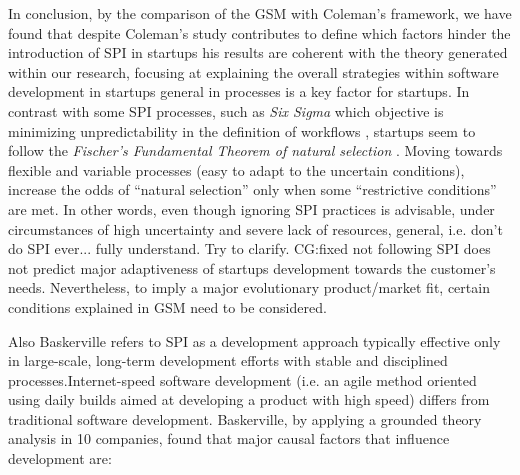 \documentclass[10pt,journal,letterpaper,compsoc]{IEEEtran}
\begin{document}
In conclusion, by the comparison of the GSM with Coleman's framework, we have
found that despite Coleman's study contributes to define which factors hinder
the introduction of SPI in startups %
his results are coherent with the theory generated within our research, focusing
at explaining the overall strategies within software development in
startups%
general in  %
processes is a key factor for startups.  In contrast with some SPI processes,
such as \textit{Six Sigma} which objective  is minimizing unpredictability in
the definition of workflows \cite{Sixsigma},  startups seem to follow the
\textit{Fischer's Fundamental Theorem of natural  selection} \cite{Fisher}.
Moving towards flexible and variable processes (easy  to adapt to the uncertain
conditions), increase the odds of ``natural  selection'' only when some
``restrictive conditions'' are met. In other words,  even though ignoring SPI
practices is advisable, under circumstances of high uncertainty and severe lack
of resources, %
general, i.e. don't do SPI ever... %
fully understand. Try to clarify. CG:fixed  not following SPI does not predict
major adaptiveness of startups development  towards the customer's needs.
Nevertheless, to imply a major evolutionary product/market fit, certain
conditions explained in GSM need to be considered.



Also Baskerville \cite{Internet} refers to SPI as a development approach
typically effective only in large-scale, long-term development efforts with
stable and disciplined processes.Internet-speed software development (i.e. an
agile method oriented using daily builds aimed at developing a product with high
speed) differs from traditional software development. Baskerville, by applying a
grounded theory analysis in 10 companies, found that major causal factors that
influence development are:
\end{document}
